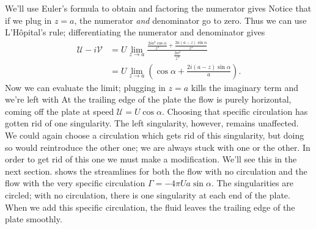 \documentclass[12pt]{book}
\begin{document}
We'll use Euler's formula to obtain
and factoring the numerator gives
Notice that if we plug in $z=a$, the numerator \textit{and} denominator go to zero.  Thus we can use L'H\^opital's rule; differentiating the numerator and denominator gives
\begin{align*}
\mathcal U - i\mathcal V &= U\lim\limits_{z\to a}\frac{\frac{2ia^2\cos\alpha}{z^3} + \frac{2a(a-z)\sin\alpha}{z^3}}{\frac{2a^2}{z^3}} \\
&= U\lim\limits_{z\to a} \left(\cos\alpha +\frac{2i(a-z)\sin\alpha}{a}\right).
\end{align*}
Now we can evaluate the limit; plugging in $z=a$ kills the imaginary term and we're left with
At the trailing edge of the plate the flow is purely horizontal, coming off the plate at speed $\mathcal U = U\cos\alpha$.  Choosing that specific circulation has gotten rid of one singularity.  The left singularity, however, remains unaffected.  We could again choose a circulation which gets rid of this singularity, but doing so would reintroduce the other one; we are always stuck with one or the other.  In order to get rid of this one we must make a modification. We'll see this in the next section.  shows the streamlines for both the flow with no circulation and the flow with the very specific circulation $\Gamma = -4\pi Ua\sin\alpha$.  The singularities are circled; with no circulation, there is one singularity at each end of the plate.  When we add this specific circulation, the fluid leaves the trailing edge of the plate smoothly.
\end{document}
